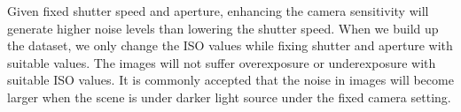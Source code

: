 Given fixed shutter speed and aperture, enhancing the camera sensitivity will generate higher noise levels than lowering the shutter speed. When we build up the dataset, we only change the ISO values while fixing shutter and aperture with suitable values. The images will not suffer overexposure or underexposure with suitable ISO values. It is commonly accepted that the noise in images will become larger when the scene is under darker light source under the fixed camera setting.



\begin{figure}
    \centering

\end{figure}
